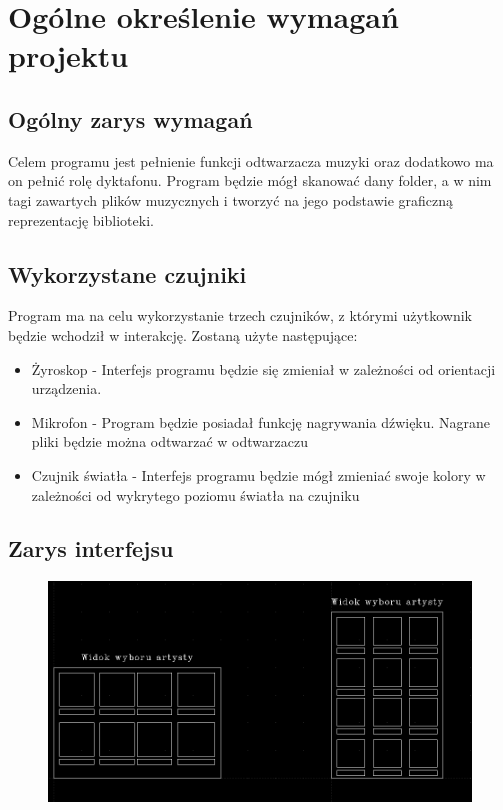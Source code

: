 	\newpage
\section{Ogólne określenie wymagań projektu}		%

\subsection{Ogólny zarys wymagań}

Celem programu jest pełnienie funkcji odtwarzacza muzyki oraz dodatkowo ma on pełnić rolę dyktafonu. Program będzie mógł skanować dany folder, a w nim tagi zawartych plików muzycznych i tworzyć na jego podstawie graficzną reprezentację biblioteki. 

\subsection{Wykorzystane czujniki}

Program ma na celu wykorzystanie trzech czujników, z którymi użytkownik będzie wchodził w interakcję. Zostaną użyte następujące:

\begin{itemize}
	\item Żyroskop - Interfejs programu będzie się zmieniał w zależności od orientacji urządzenia. 
	
	\item Mikrofon - Program będzie posiadał funkcję nagrywania dźwięku. Nagrane pliki będzie można odtwarzać w odtwarzaczu

	\item Czujnik światła - Interfejs programu będzie mógł zmieniać swoje kolory w zależności od wykrytego poziomu światła na czujniku
\end{itemize}

\subsection{Zarys interfejsu}

\begin{figure}[H]
	\centering
	\includegraphics[width=1\textwidth]{images/mockup_artysta.png}
	\caption{}
\end{figure}

